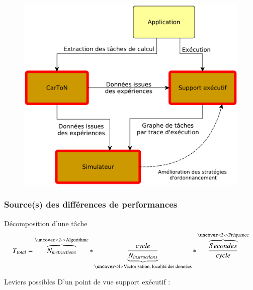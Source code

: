 \documentclass[xcolor={usenames,dvipsnames,svgnames,table}, aspectratio=43]{beamer}
\begin{document}
\begin{frame}
\begin{minipage}[t]{0.60\linewidth}
\begin{figure}
{	\includegraphics[width=\textwidth]{graph/big_picture-part1-3.pdf}%
      }%
    \end{figure}
  \end{minipage}
\end{frame}

\begin{frame}
  \frametitle{Source(s) des différences de performances}

  \begin{block}{Décomposition d'une tâche}
    $$ T_{total} = \overbrace{N_{instructions}}^\text{\uncover<2->{Algorithme}} * \underbrace{\frac{cycle}{N_{instructions}}}_\text{\uncover<4>{Vectorisation, localité des données}} * \overbrace{\frac{Secondes}{cycle}}^\text{\uncover<3->{Fréquence}} $$
  \end{block}

  \begin{block}{Leviers possibles}
    D'un point de vue support exécutif :
    \begin{itemize}
    \end{itemize}
  \end{block}

\end{frame}
\end{document}
